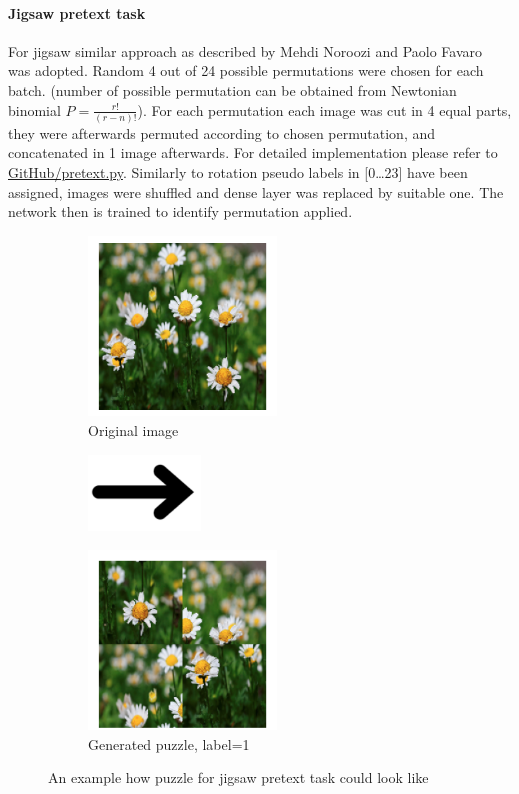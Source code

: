 \paragraph{Jigsaw pretext task}
For jigsaw similar approach as described by Mehdi Noroozi and Paolo Favaro~\cite{DBLP:journals/corr/NorooziF16} was adopted.
Random 4 out of 24 possible permutations were chosen for each batch.
(number of possible permutation can be obtained from Newtonian binomial $P=\frac{r!}{(r-n)!}$).
For each permutation each image was cut in 4 equal parts, they were afterwards permuted according to chosen permutation,
and concatenated in 1 image afterwards.
For detailed implementation please refer to \href{https://github.com/Goofy-Goof/ISS/blob/33a2ad40b779ff230aae31c29d2edc2cf5d90406/impl/util/pretext.py}{GitHub/pretext.py}.
Similarly to rotation pseudo labels in [0\ldots23] have been assigned, images were shuffled and dense layer was replaced by suitable one.
The network then is trained to identify permutation applied.
\\
\begin{figure}[h]
    \begin{subfigure}{0.33\textwidth}
        \caption{Original image}
        \includegraphics[width=5cm]{images/dandelion}
    \end{subfigure}
    \begin{subfigure}{0.2\textwidth}
        \includegraphics[width=3cm]{images/arrow}
    \end{subfigure}
    \begin{subfigure}{0.33\textwidth}
        \caption{Generated puzzle, label=1}
        \includegraphics[width=5cm]{images/puzzle}
    \end{subfigure}
    \caption{An example how puzzle for jigsaw pretext task could look like}
\end{figure}

